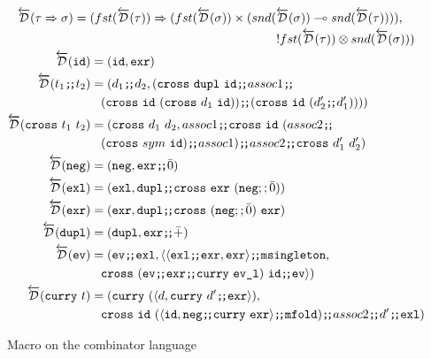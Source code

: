   \begin{figure}
    \centering
    \begin{gather*}
      \begin{multlined}
        \Drev(\tau \synFunc \sigma) =
          (fst(\Drev(\tau)) \synFunc
            (fst(\Drev(\sigma)) \synStar
              (snd(\Drev(\sigma)) \synLin snd(\Drev(\tau)))),
          \\ \synTens{fst(\Drev(\tau))}{snd(\Drev(\sigma))})
      \end{multlined} \\
      \begin{aligned}
        \Drev(\synId) &= (\synId, \synExr) \\
        \Drev(\synSeq{t_1}{t_2}) &= (\synSeq{d_1}{d_2},
        (\synSeq{\synSeq{\synSeq{\synCross{\synDupl}{\synId}}{assoc1}}{
          \\&\;\;\; (\synCross{\synId}{(\synCross{d_1}{\synId})})}}{
          (\synCross{\synId}{(\synSeq{d_2'}{d_1'})})})) \\
        \Drev(\synCross{t_1}{t_2}) &= (\synCross{d_1}{d_2},
          \synSeq{assoc1}{
            \synSeq{\synCross{\synId}{(
              \synSeq{assoc2}{
                \synSeq{\\&\;\;\;(\synCross{sym}{\synId})}{assoc1}})}}{
                  \synSeq{assoc2}{\synCross{d_1'}{d_2'}}}}) \\
        \Drev(\synNeg) &= (\synNeg, \synSeq{\synExr}{\synO}) \\
        \Drev(\synExl) &= (\synExl, \synSeq{\synDupl}{\synCross{\synExr}{(\synNeg ;; \synO)}}) \\
        \Drev(\synExr) &= (\synExr, \synSeq{\synDupl}{\synCross{(\synNeg ;; \synO)}{\synExr}}) \\
        \Drev(\synDupl) &= (\synDupl, \synSeq{\synExr}{\synP}) \\
        \Drev(\synEv) &= (\synSeq{\synEv}{\synExl}, \langle \synSeq{\langle \synSeq{\synExl}{\synExr}, \synExr \rangle}{\synMsingleton},
          \\&\;\;\; \synSeq{\synCross{(\synSeq{\synEv}{
            \synSeq{\synExr}{\synCurry{\synEvL}}})}{\synId}}{\synEv} \rangle) \\
        \Drev(\synCurry{t}) &= (\synCurry (\langle d, \synSeq{\synCurry{d'}}{\synExr} \rangle),
        \\&\;\;\; \synSeq{\synCross{\synId}{(\synSeq{\langle \synId, \synSeq{\synNeg}{\synCurry{\synExr}}\rangle}{\synMfold})}}
          {\synSeq{assoc2}{\synSeq{d'}{\synExl}}})
      \end{aligned}
    \end{gather*}
    \caption{Macro on the combinator language}
    \label{fig:macro_combinator}
  \end{figure}

